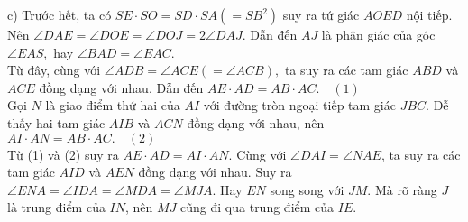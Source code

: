 \begin{ex}
{{
}
    c) Trước hết, ta có $SE\cdot SO=SD\cdot SA(=SB^2)$ suy ra tứ giác $AOED$ nội tiếp. Nên $\angle{DAE}=\angle{DOE}=\angle{DOJ}=2\angle{DAJ}.$ Dẫn đến $AJ$ là phân giác của góc $\angle{EAS},$ hay $\angle{BAD}=\angle{EAC}.$\\
    Từ đây, cùng với $\angle{ADB}=\angle{ACE}(=\angle{ACB}),$ ta suy ra các tam giác $ABD$ và $ACE$ đồng dạng với nhau. Dẫn đến $AE\cdot AD=AB\cdot AC.\quad (1)$\\
    Gọi $N$ là giao điểm thứ hai của $AI$ với đường tròn ngoại tiếp tam giác $JBC$. Dễ thấy hai tam giác $AIB$ và $ACN$ đồng dạng với nhau, nên $AI\cdot AN=AB\cdot AC. \quad (2)$\\
    Từ (1) và (2) suy ra $AE\cdot AD=AI\cdot AN.$ Cùng với $\angle{DAI}=\angle{NAE}$, ta suy ra các tam giác $AID$ và $AEN$ đồng dạng với nhau. Suy ra $\angle{ENA}=\angle{IDA}=\angle{MDA}=\angle{MJA}.$ Hay $EN$ song song với $JM$. Mà rõ ràng $J$ là trung điểm của $IN$, nên $MJ$ cũng đi qua trung điểm của $IE$.
}
\end{ex}


